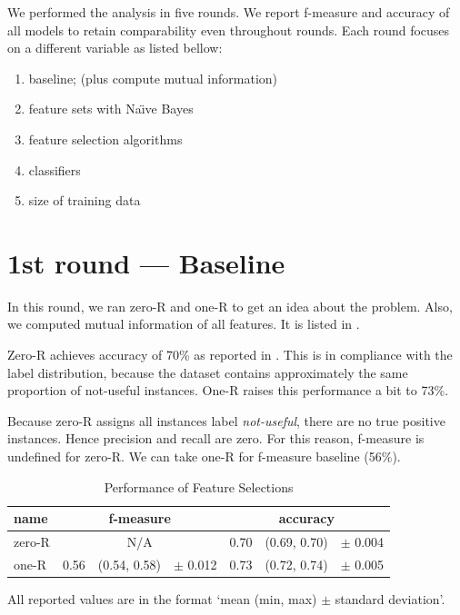 We performed the analysis in five rounds.
We report f-measure and accuracy of all models to retain comparability even throughout rounds.
Each round focuses on a different variable as listed bellow:

\begin{enumerate}
	\item baseline; (plus compute mutual information)
	\item feature sets with Na\"{\i}ve Bayes
	\item feature selection algorithms
	\item classifiers
	\item size of training data
\end{enumerate}


\section{1st round --- Baseline}

In this round, we ran zero-R and one-R to get an idea about the problem.
Also, we computed mutual information of all features.
It is listed in .

Zero-R achieves accuracy of 70\% as reported in .
This is in compliance with the label distribution,
because the dataset contains approximately the same proportion of not-useful instances.
One-R raises this performance a bit to 73\%.

Because zero-R assigns all instances label \textit{not-useful},
there are no true positive instances.
Hence precision and recall are zero.
For this reason, f-measure is undefined for zero-R.
We can take one-R for f-measure baseline (56\%).

\begin{table}[h!]

\centering
\begin{tabular}{lr@{~}r@{~}rr@{~}r@{~}r}
\toprule
\textbf{name}	& \multicolumn{3}{c}{\textbf{f-measure}} & \multicolumn{3}{c}{\textbf{accuracy}} \\
\midrule
zero-R & \multicolumn{3}{c}{N/A} & 0.70 & (0.69, 0.70) & $\pm$ 0.004 \\
one-R & 0.56 & (0.54, 0.58) & $\pm$ 0.012 & 0.73 & (0.72, 0.74) & $\pm$ 0.005 \\

\bottomrule
\end{tabular}

\caption{Performance of Feature Selections}\label{tab:base_perf}
All reported values are in the format `mean (min, max) $\pm$ standard deviation'.
\end{table}


